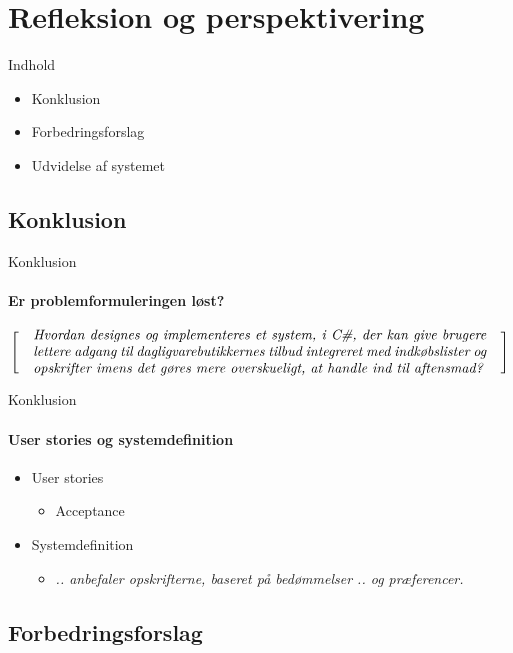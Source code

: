 \section{Refleksion og perspektivering}
\begin{frame}{Indhold}
  \begin{itemize}
    \item Konklusion
    \item Forbedringsforslag
    \item Udvidelse af systemet
  \end{itemize}
\end{frame}

\subsection{Konklusion}
\begin{frame}{Konklusion}
  \framesubtitle{Er problemformuleringen løst?}
  \[
  \left[
  \begin{minipage}{\textwidth}
  \centering
  \begin{minipage}{0.94\textwidth}
  \textit{Hvordan designes og implementeres et system, i C\#, der kan give brugere lettere adgang til dagligvarebutikkernes tilbud integreret med indkøbslister og opskrifter imens det gøres mere overskueligt, at handle ind til aftensmad?}
  \end{minipage} 
  \end{minipage}                           
    \right]
\]
\end{frame}
\begin{frame}{Konklusion}
  \framesubtitle{User stories og systemdefinition}
    \begin{itemize}
      \item User stories
      \begin{itemize}
        \item Acceptance
      \end{itemize}
      \item Systemdefinition
      \begin{itemize}
        \item \textit{.. anbefaler opskrifterne, baseret på bedømmelser .. og præferencer.}
      \end{itemize}      
    \end{itemize}
\end{frame}

\subsection{Forbedringsforslag}

